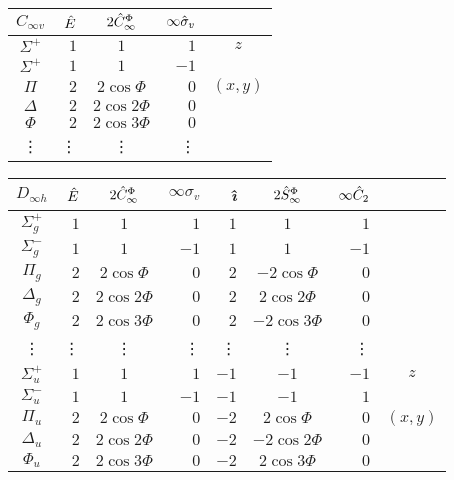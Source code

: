 \documentclass[../../Atom-ogMolekylefysik.tex]{subfiles}
\begin{document}
\vspace{1cm}

\begin{tabular}{c|r c r|c}
$C_{\infty v}$ & $\hat E$ & $2\hat C_\infty^\Phi$ & $\infty \hat \sigma_v$\\\hline
$\Sigma^+$ & $1$ & $1$ & $1$ & $z$\\
$\Sigma^+$ & $1$ & $1$ & $-1$\\
$\Pi$ & $2$ & $2\cos \Phi$ & $0$ & $(x,y)$\\
$\Delta$ & $2$ & $2\cos 2\Phi$ & $0$\\
$\Phi$ & $2$ & $2\cos 3\Phi$ & $0$\\
\vdots&\vdots&\vdots&\vdots
\end{tabular}

\vspace{1cm}

\begin{tabular}{c|r c r r c r|c}
$D_{\infty h}$ & $\hat E$ & $2\hat C_\infty^\Phi$ & $\infty \sigma_v$ & \textit{\^\i} & $2\hat S_\infty^\Phi$ & $\infty\hat C_2$\\\hline
$\Sigma_g^+$ & $1$ & $1$ & $1$ & $1$ & $1$ & $1$\\
$\Sigma_g^-$ & $1$ & $1$ & $-1$ & $1$ & $1$ & $-1$\\
$\Pi_g$ & $2$ & $2\cos\Phi$ & $0$ & $2$ & $-2\cos\Phi$ & $0$\\
$\Delta_g$ & $2$ & $2\cos2\Phi$ & $0$ & $2$ & $2\cos2\Phi$ & $0$\\
$\Phi_g$ & $2$ & $2\cos3\Phi$ & $0$ & $2$ & $-2\cos3\Phi$ & $0$\\
\vdots&\vdots&\vdots&\vdots&\vdots&\vdots&\vdots\\
$\Sigma_u^+$ & $1$ & $1$ & $1$ & $-1$ & $-1$ & $-1$ & $z$\\
$\Sigma_u^-$ & $1$ & $1$ & $-1$ & $-1$ & $-1$ & $1$\\
$\Pi_u$ & $2$ & $2\cos\Phi$ & $0$ & $-2$ & $2\cos\Phi$ & $0$ & $(x,y)$\\
$\Delta_u$ & $2$ & $2\cos2\Phi$ & $0$ & $-2$ & $-2\cos2\Phi$ & $0$\\
$\Phi_u$ & $2$ & $2\cos3\Phi$ & $0$ & $-2$ & $2\cos3\Phi$ & $0$
\end{tabular}
\end{document}
